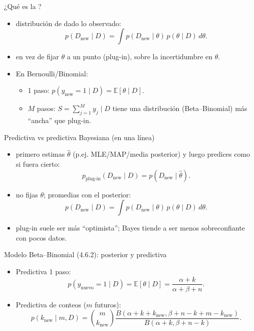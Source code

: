 \begin{frame}{¿Qué es la ?}
\begin{itemize}
  \item {} distribución de  dado lo observado:
  \[
    p(D_{\text{new}}\mid D)=\int p(D_{\text{new}}\mid \theta)\,p(\theta\mid D)\,d\theta.
  \]
  \item {} en vez de fijar \(\theta\) a un punto (plug-in),  sobre la incertidumbre en \(\theta\).
  \item En Bernoulli/Binomial:
  \begin{itemize}
    \item 1 paso: \(p(y_{\text{new}}=1\mid D)=\mathbb{E}[\theta\mid D]\).
    \item \(M\) pasos: \(S=\sum_{j=1}^M y_j \mid D\) tiene una distribución (Beta--Binomial) más “ancha” que plug-in.
  \end{itemize}
\end{itemize}
\end{frame}

\begin{frame}{Predictiva  vs predictiva Bayesiana (en una línea)}
\begin{itemize}
  \item {} primero estimas \(\hat\theta\) (p.ej. MLE/MAP/media posterior) y luego predices como si fuera cierto:
  \[
    p_{\text{plug-in}}(D_{\text{new}}\mid D)=p(D_{\text{new}}\mid \hat\theta).
  \]
  \item {} no fijas \(\theta\); promedias con el posterior:
  \[
    p(D_{\text{new}}\mid D)=\int p(D_{\text{new}}\mid \theta)\,p(\theta\mid D)\,d\theta.
  \]
  \item {} plug-in suele ser más “optimista”; Bayes tiende a ser menos sobreconfiante con pocos datos.
\end{itemize}
\end{frame}

\begin{frame}{Modelo Beta--Binomial (4.6.2): posterior y predictiva}
\begin{itemize}
  \item Predictiva 1 paso:
  \[
    p(y_{\text{nuevo}}=1\mid D)=\mathbb{E}[\theta\mid D]=\frac{\alpha+k}{\alpha+\beta+n}.
  \]
  \item Predictiva de conteos (\(m\) futuros):
  \[
    p(k_{\text{new}}\mid m,D)=\binom{m}{k_{\text{new}}}
    \frac{B(\alpha+k+k_{\text{new}},\beta+n-k+m-k_{\text{new}})}{B(\alpha+k,\beta+n-k)}.
  \]
\end{itemize}
\end{frame}

